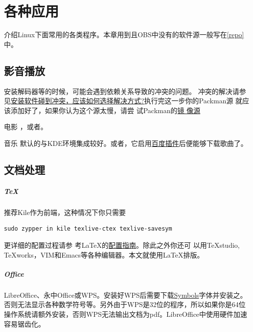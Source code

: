 \chapter{各种应用}
介绍Linux下面常用的各类程序。本章用到且OBS中没有的软件源一般写在\ref{repo}中。
\section{影音播放}
安装解码器等的时候，可能会遇到依赖关系导致的冲突的问题。
冲突的解决请参见\href{https://forum.suse.org.cn/viewtopic.php?t=2867&p=22491#p22491}{安装软件碰到冲突，应该如何选择解决方式?}执行完这一步你的Packman源
就应该添加好了，如果你认为这个源太慢，请尝
试Packman的\href{http://packman.links2linux.org/mirrors}{镜%
像源}
\begin{compactdesc}
 \item[电影] ，或者。
 \item[音乐] 默认的与KDE环境集成较好。或者，它启用\href{https://forum.suse.org.cn/viewtopic.php?f=7&t=2530}{百度插件}后便能够下载歌曲了。
\end{compactdesc}

\section{文档处理}
\paragraph{\TeX}推荐Kile作为前端，这种情况下你只需要
\begin{Verbatim}[formatcom=\color{codec}]
    sudo zypper in kile texlive-ctex texlive-savesym
\end{Verbatim}
更详细的配置过程请参
考\LaTeX 的\href{https://forum.suse.org.cn/viewtopic.php?f=6&t=2392&p=18750}{配置指南}。除此之外你还可
以用\TeX studio, \TeX works，VIM和Emacs等各种编辑器。本文就使用\LaTeX 排版。

\paragraph{Office}LibreOffice、永中Office或WPS。安装好WPS后需要下载\href{http://pan.baidu.com/s/1ntMEU2P}{Symbols}字体并安装之。否则无法显示各种数学符号等。另外由于WPS是32位的程序，所以如果你是64位操作系统请额外安装，否则WPS无法输出文档为pdf。LibreOffice中使用硬件加速容易锯齿化。
